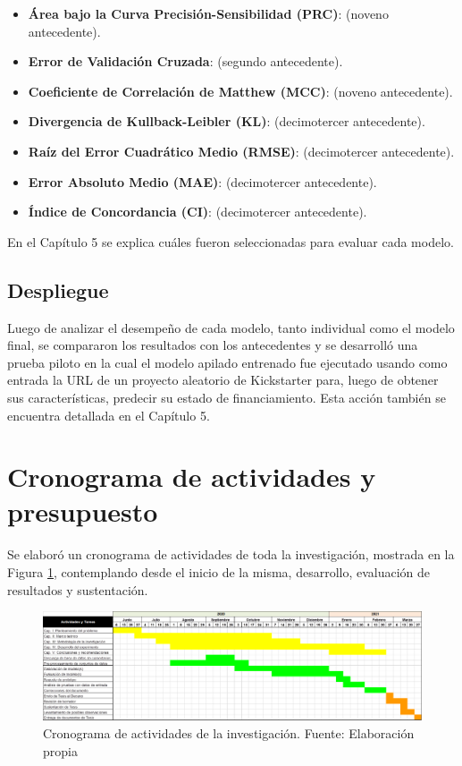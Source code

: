 \begin{itemize}
	\item \textbf{Área bajo la Curva Precisión-Sensibilidad (PRC)}: \cite{pr_kaur2017socmedcrowd} (noveno antecedente).
	\item \textbf{Error de Validación Cruzada}: \cite{pr_mitra2014phrases} (segundo antecedente).
	\item \textbf{Coeficiente de Correlación de Matthew (MCC)}: \cite{pr_kaur2017socmedcrowd} (noveno antecedente).
	\item \textbf{Divergencia de Kullback-Leibler (KL)}: \cite{pr_jin2019dayssuccess} (decimotercer antecedente).
	\item \textbf{Raíz del Error Cuadrático Medio (RMSE)}: \cite{pr_jin2019dayssuccess} (decimotercer antecedente).
	\item \textbf{Error Absoluto Medio (MAE)}: \cite{pr_jin2019dayssuccess} (decimotercer antecedente).
	\item \textbf{Índice de Concordancia (CI)}: \cite{pr_jin2019dayssuccess} (decimotercer antecedente).
\end{itemize}

En el Capítulo 5 se explica cuáles fueron seleccionadas para evaluar cada modelo.

\subsection{Despliegue}
Luego de analizar el desempeño de cada modelo, tanto individual como el modelo final, se compararon los resultados con los antecedentes y se desarrolló una prueba piloto en la cual el modelo apilado entrenado fue ejecutado usando como entrada la URL de un proyecto aleatorio de Kickstarter para, luego de obtener sus características, predecir su estado de financiamiento. Esta acción también se encuentra detallada en el Capítulo 5.

\section{Cronograma de actividades y presupuesto}
Se elaboró un cronograma de actividades de toda la investigación, mostrada en la Figura \ref{3:fig5}, contemplando desde el inicio de la misma, desarrollo, evaluación de resultados y sustentación.
\begin{figure}[h]
	\begin{center}
		\includegraphics[width=1.1\textwidth]{3/figures/cronograma.png}
		\caption{Cronograma de actividades de la investigación. Fuente: Elaboración propia}
		\label{3:fig5}
	\end{center}
\end{figure}

